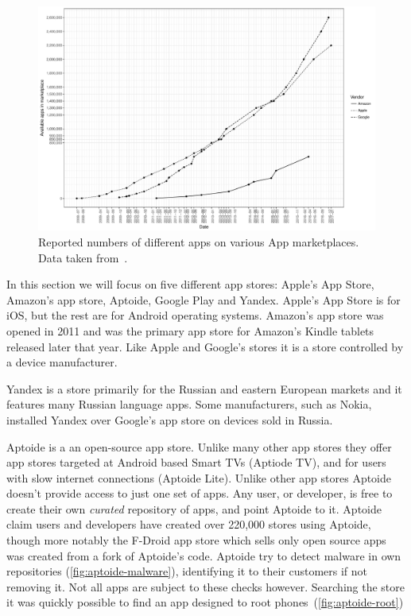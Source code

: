 \documentclass[thesis.tex]{subfiles}
\begin{document}
\begin{figure}
  \includegraphics[width=\textwidth]{figures/app-store-apps.pdf}
  \caption[Reported numbers of different apps on various App marketplaces.]{%
    Reported numbers of different apps on various App marketplaces. Data taken from~\cite{statista_google_nodate,statista_apple_nodate,statista_amazon_nodate}.}
  \label{fig:app-store-apps}
\end{figure}

In this section we will focus on five different app stores: Apple's App Store,
Amazon's app store, Aptoide, Google Play and Yandex.  Apple's App Store is for iOS,
but the rest are for Android operating systems.  
Amazon's app store was opened in 2011 and was the primary app store for Amazon's
Kindle tablets released later that year.  Like Apple and Google's stores it is a
store controlled by a device manufacturer.

Yandex is a store primarily for the Russian and eastern European markets
and it features many Russian language apps. Some manufacturers,
such as Nokia, installed Yandex over Google's app store on devices sold in
Russia.

Aptoide is a an open-source app store.  Unlike many other app stores
they offer app stores targeted at Android based Smart TVs (Aptiode
TV), and for users with slow internet connections (Aptoide Lite).
Unlike other app stores Aptoide doesn't provide access to just one set
of apps.  Any user, or developer, is free to create their own
\emph{curated} repository of apps, and point Aptoide to it.  Aptoide
claim users and developers have created over 220,000 stores using
Aptoide, though more notably the F-Droid app store which sells only
open source apps was created from a fork of Aptoide's code.  Aptoide
try to detect malware in own repositories
(\autoref{fig:aptoide-malware}), identifying it to their customers if
not removing it.  Not all apps are subject to these checks however.
Searching the store it was quickly possible to find an app designed to
root phones~(\autoref{fig:aptoide-root})
\end{document}
